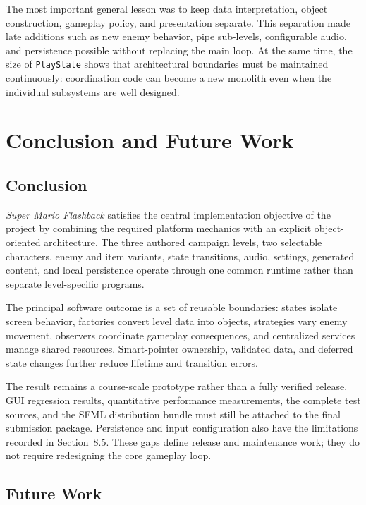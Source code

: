 \documentclass{template}
\begin{document}
The most important general lesson was to keep data interpretation, object
construction, gameplay policy, and presentation separate. This separation made
late additions such as new enemy behavior, pipe sub-levels, configurable audio,
and persistence possible without replacing the main loop. At the same time,
the size of \texttt{PlayState} shows that architectural boundaries must be
maintained continuously: coordination code can become a new monolith even when
the individual subsystems are well designed.

\section{Conclusion and Future Work}

\subsection{Conclusion}

\textit{Super Mario Flashback} satisfies the central implementation objective
of the project by combining the required platform mechanics with an explicit
object-oriented architecture. The three authored campaign levels, two
selectable characters, enemy and item variants, state transitions, audio,
settings, generated content, and local persistence operate through one common
runtime rather than separate level-specific programs.

The principal software outcome is a set of reusable boundaries: states isolate
screen behavior, factories convert level data into objects, strategies vary
enemy movement, observers coordinate gameplay consequences, and centralized
services manage shared resources. Smart-pointer ownership, validated data, and
deferred state changes further reduce lifetime and transition errors.

The result remains a course-scale prototype rather than a fully verified
release. GUI regression results, quantitative performance measurements, the
complete test sources, and the SFML distribution bundle must still be attached
to the final submission package. Persistence and input configuration also have
the limitations recorded in Section~8.5. These gaps define release and
maintenance work; they do not require redesigning the core gameplay loop.

\subsection{Future Work}
\end{document}
